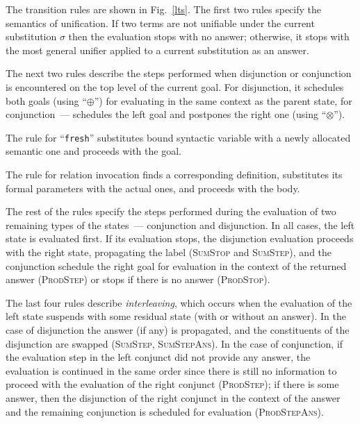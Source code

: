 The transition rules are shown in Fig.~\ref{lts}. The first two rules specify the semantics of unification. If two terms are not unifiable under the current substitution
$\sigma$ then the evaluation stops with no answer; otherwise, it stops with the most general unifier applied to a current substitution as an answer.

The next two rules describe the steps performed when disjunction or conjunction is encountered on the top level of the current goal. For disjunction, it schedules both goals (using ``$\oplus$'') for
evaluating in the same context as the parent state, for conjunction~--- schedules the left goal and postpones the right one (using ``$\otimes$'').

The rule for ``\lstinline|fresh|'' substitutes bound syntactic variable with a newly allocated semantic one and proceeds with the goal.

The rule for relation invocation finds a corresponding definition, substitutes its formal parameters with the actual ones, and proceeds with the body.

The rest of the rules specify the steps performed during the evaluation of two remaining types of the states~--- conjunction and disjunction. In all cases, the left state
is evaluated first. If its evaluation stops, the disjunction evaluation proceeds with the right state, propagating the label (\textsc{SumStop} and \textsc{SumStep}), and the conjunction schedule the right goal for evaluation in the context of the returned answer (\textsc{ProdStep}) or stops if there is no answer (\textsc{ProdStop}).

The last four rules describe \emph{interleaving}, which occurs when the evaluation of the left state suspends with some residual state (with or without an answer). In the case of disjunction
the answer (if any) is propagated, and the constituents of the disjunction are swapped (\textsc{SumStep}, \textsc{SumStepAns}). In the case of conjunction, if the evaluation step in
the left conjunct did not provide any answer, the evaluation is continued in the same order since there is still no information to proceed with the evaluation of the right
conjunct (\textsc{ProdStep}); if there is some answer, then the disjunction of the right conjunct in the context of the answer and the remaining conjunction is
scheduled for evaluation (\textsc{ProdStepAns}).

